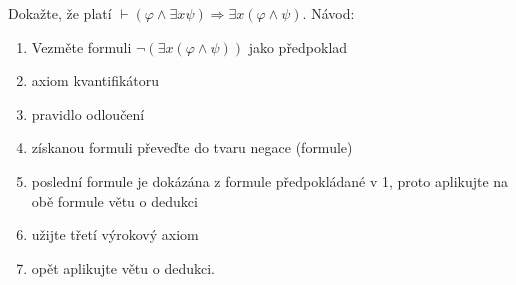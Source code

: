 Dokažte, že platí $\vdash (\varphi \wedge \exists x \psi) \Rightarrow \exists
x(\varphi \wedge \psi)$. Návod:

\begin{enumerate}
  \item Vezměte formuli $\neg ( \exists x(\varphi \wedge \psi))$ jako předpoklad
  \item axiom kvantifikátoru
  \item pravidlo odloučení
  \item získanou formuli převeďte do tvaru negace (formule)
  \item poslední formule je dokázána z formule předpokládané v 1, proto
  aplikujte na obě formule větu o dedukci
  \item užijte třetí výrokový axiom
  \item opět aplikujte větu o dedukci.
\end{enumerate}
